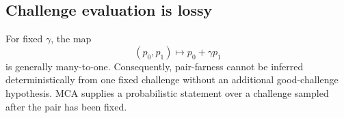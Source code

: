 \subsection{Challenge evaluation is lossy}

For fixed \(\gamma\), the map
\[
  (p_0,p_1)\longmapsto p_0+\gamma p_1
\]
is generally many-to-one.  Consequently, pair-farness cannot be inferred
deterministically from one fixed challenge without an additional good-challenge
hypothesis.  MCA supplies a probabilistic statement over a challenge sampled
after the pair has been fixed.
